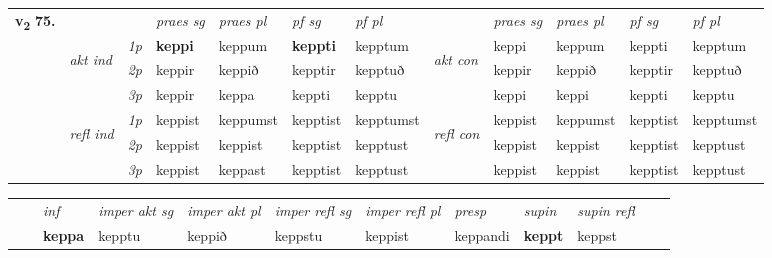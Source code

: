 \begin{tabular}{llllllllllll} \toprule
\multirow{4}{*}{{{\textbf{v{\textsubscript{2}}} \Large{\textbf{75.}}}}}  & &   &  \textit{praes sg}  & \textit{praes pl}  &\textit{ pf sg} & \textit{pf pl} &  &  \textit{praes sg}  & \textit{praes pl}  & \textit{pf sg} & \textit{pf pl } \\*
	\cmidrule{4-7} \cmidrule{9-12}
 & \multirow{3}{*}{\begin{turn}{90}\textit{akt ind}\end{turn}} & {\textit{1p}} & \textbf{keppi} & keppum    & \textbf{keppti} & kepptum & \multirow{3}{*}{\begin{turn}{90}\textit{akt con}\end{turn}} &keppi & keppum & keppti & kepptum\\*
& &  {\textit{2p}} &  keppir  & keppið   & kepptir & kepptuð & & keppir & keppið & kepptir & kepptuð \\*
& &  {\textit{3p}} & keppir & keppa   & keppti & kepptu & & keppi & keppi& keppti & kepptu  \\*
\cmidrule{4-7} \cmidrule{9-12}
 &\multirow{3}{*}{\begin{turn}{90}\textit{refl ind}\end{turn}} & {\textit{1p}} & keppist & keppumst    & kepptist & kepptumst & \multirow{3}{*}{\begin{turn}{90}\textit{refl con}\end{turn}}  &keppist & keppumst & kepptist & kepptumst\\*
 &&  {\textit{2p}} &  keppist  & keppist   & kepptist & kepptust & &keppist & keppist & kepptist & kepptust \\*
& &  {\textit{3p}} & keppist & keppast   & kepptist & kepptust & & keppist & keppist& kepptist & kepptust  \\*
\cmidrule{4-7} \cmidrule{9-12}
\end{tabular}


\begin{tabular}{llllllllllll}
 & & \textit{inf} & \textit{imper akt sg} & \textit{imper akt pl} & \textit{imper refl sg} & \textit{imper refl pl} & \textit{presp} & \textit{supin} & \textit{supin refl}      \\*
  & & \textbf{keppa} & kepptu  & keppið & keppstu & keppist & keppandi &  \textbf{keppt} & keppst  \\*
\cmidrule{1-12}
\end{tabular}



